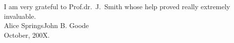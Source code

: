 \acknowledgments

I am very grateful to Prof.dr.\ J.\ Smith whose help proved really extremely
invaluable.\\[2ex]				
Alice Springs\hfill John B. Goode\\
October, 200X.

